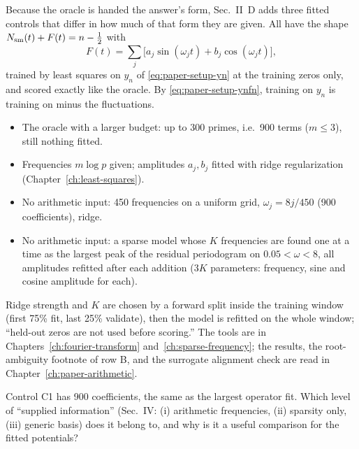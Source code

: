 Because the oracle is handed the answer's form, Sec.~II~D adds three fitted controls that differ in how much of that form they are given. All have the shape $N_{\mathrm{sm}}(t)+F(t)=n-\tfrac12$ with
\begin{equation}
F(t)=\sum_j\bigl[a_j\sin(\omega_jt)+b_j\cos(\omega_jt)\bigr],
\label{eq:paper-setup-F}
\end{equation}
trained by least squares on $y_n$ of \eqref{eq:paper-setup-yn} at the training zeros only, and scored exactly like the oracle. By \eqref{eq:paper-setup-ynfn}, training on $y_n$ is training on minus the fluctuations.
\begin{itemize}
\item[(A)] The oracle with a larger budget: up to 300 primes, i.e.\ 900 terms ($m\le3$), still nothing fitted.
\item[(B)] Frequencies $m\log p$ given; amplitudes $a_j,b_j$ fitted with ridge regularization (Chapter~\ref{ch:least-squares}).
\item[(C1)] No arithmetic input: 450 frequencies on a uniform grid, $\omega_j=8j/450$ (900 coefficients), ridge.
\item[(C2)] No arithmetic input: a sparse model whose $K$ frequencies are found one at a time as the largest peak of the residual periodogram on $0.05<\omega<8$, all amplitudes refitted after each addition ($3K$ parameters: frequency, sine and cosine amplitude for each).
\end{itemize}
Ridge strength and $K$ are chosen by a forward split inside the training window (first 75\% fit, last 25\% validate), then the model is refitted on the whole window; ``held-out zeros are not used before scoring.'' The tools are in Chapters~\ref{ch:fourier-transform} and~\ref{ch:sparse-frequency}; the results, the root-ambiguity footnote of row B, and the surrogate alignment check are read in Chapter~\ref{ch:paper-arithmetic}.

\begin{checkpoint}
Control C1 has 900 coefficients, the same as the largest operator fit. Which level of ``supplied information'' (Sec.~IV: (i) arithmetic frequencies, (ii) sparsity only, (iii) generic basis) does it belong to, and why is it a useful comparison for the fitted potentials?
\end{checkpoint}

